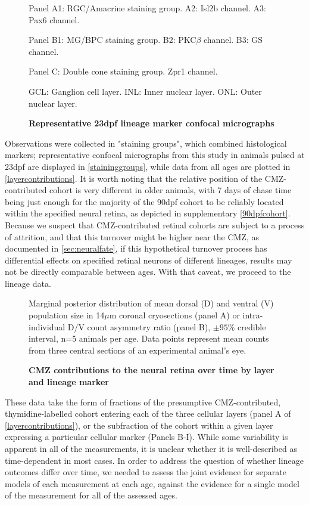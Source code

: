 \begin{figure}[!h]
    \caption{{\bf Representative 23dpf lineage marker confocal micrographs}}
    Panel A1: RGC/Amacrine staining group. A2: Isl2b channel. A3: Pax6 channel.

    Panel B1: MG/BPC staining group. B2: PKC$\beta$ channel. B3: GS channel.

    Panel C: Double cone staining group. Zpr1 channel.

    GCL: Ganglion cell layer. INL: Inner nuclear layer. ONL: Outer nuclear layer.
    \label{staininggroups}
\end{figure}

Observations were collected in "staining groups", which combined histological markers; representative confocal micrographs from this study in animals pulsed at 23dpf are displayed in \autoref{staininggroups}, while data from all ages are plotted in \autoref{layercontributions}. It is worth noting that the relative position of the CMZ-contributed cohort is very different in older animals, with 7 days of chase time being just enough for the majority of the 90dpf cohort to be reliably located within the specified neural retina, as depicted in supplementary \autoref{90dpfcohort}. Because we suspect that CMZ-contributed retinal cohorts are subject to a process of attrition, and that this turnover might be higher near the CMZ, as documented in \autoref{sec:neuralfate}, if this hypothetical turnover process has differential effects on specified retinal neurons of different lineages, results may not be directly comparable between ages. With that caveat, we proceed to the lineage data.

\begin{figure}[!h]
    \caption{{\bf CMZ contributions to the neural retina over time by layer and lineage marker}}
    Marginal posterior distribution of mean dorsal (D) and ventral (V) population size in 14$\mu$m coronal cryosections (panel A) or intra-individual D/V count asymmetry ratio (panel B), $\pm 95\%$ credible interval, n=5 animals per age. Data points represent mean counts from three central sections of an experimental animal's eye. 
    \label{layercontributions}
\end{figure}

These data take the form of fractions of the presumptive CMZ-contributed, thymidine-labelled cohort entering each of the three cellular layers (panel A of \autoref{layercontributions}), or the subfraction of the cohort within a given layer expressing a particular cellular marker (Panels B-I). While some variability is apparent in all of the measurements, it is unclear whether it is well-described as time-dependent in most cases. In order to address the question of whether lineage outcomes differ over time, we needed to assess the joint evidence for separate models of each measurement at each age, against the evidence for a single model of the measurement for all of the assessed ages. 

